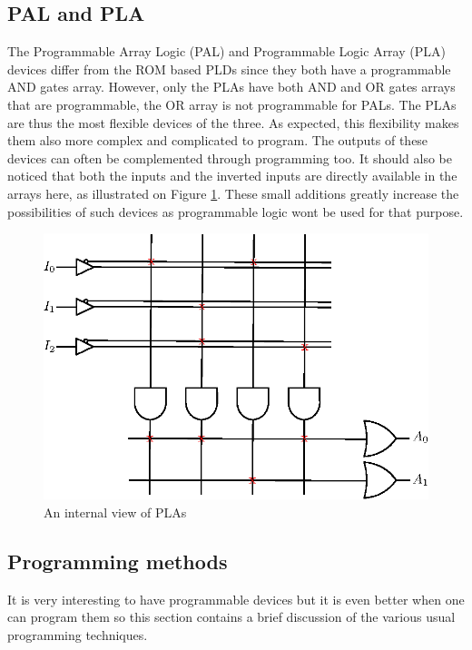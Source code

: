 \subsection{PAL and PLA}

The Programmable Array Logic (PAL) and Programmable Logic Array (PLA) devices differ from the ROM 
based PLDs since they both have a programmable AND gates array. However, only the PLAs have both AND and
OR gates arrays that are programmable, the OR array is not programmable for PALs. The PLAs are thus 
the most flexible devices of the three.
As expected, this flexibility makes them also more complex and complicated to program. The outputs
of these devices can often be complemented through programming too. It should also be noticed
that both the inputs and the inverted inputs are directly available in the arrays here, as illustrated on
Figure \ref{fig:fpga/pld_pla_internal}. These small additions greatly increase the possibilities
of such devices as programmable logic wont be used for that purpose.

\begin{figure}[H]
    \centering
    \includegraphics[scale=0.8]{Chapter1-Hardware/res/pld_pla}
    \caption{An internal view of PLAs}
    \label{fig:fpga/pld_pla_internal}
\end{figure}

\subsection{Programming methods}

It is very interesting to have programmable devices but it is even better when one can program them 
so this section contains a brief discussion of the various usual programming techniques.
 
